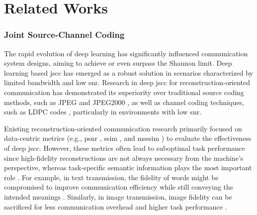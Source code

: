 \section{Related Works}
\subsubsection{Joint Source-Channel Coding}
The rapid evolution of deep learning has significantly influenced communication system designs, aiming to achieve or even surpass the Shannon limit. Deep learning based \gls{jscc} has emerged as a robust solution in scenarios characterized by limited bandwidth and low \gls{snr}. Research in deep \gls{jscc} for reconstruction-oriented communication \cite{Kurka_2019_SRo, Bourtsoulatze_2019_DJS, Kurka_2020_DfD} has demonstrated its superiority over traditional source coding methods, such as JPEG \cite{Wallace_1992_TJs} and JPEG2000 \cite{Taubman_2002_JIc}, as well as channel coding techniques, such as LDPC codes \cite{Gallager_1962_Ldp}, particularly in environments with low \gls{snr}.

Existing reconstruction-oriented communication research primarily focused on data-centric metrics (e.g., \gls{psnr} \cite{Kurka_2019_SRo, Tung_2022_DQC, Yang_2022_OGD, Tung_2022_DLA, Kurka_2020_DfD}, \gls{ssim} \cite{Bourtsoulatze_2019_DJS, Tung_2022_DLA, Yang_2022_OGD, Kurka_2020_DfD}, and \gls{msssim} \cite{Yang_2022_OGD, Tung_2022_DLA, Kurka_2020_DfD}) to evaluate the effectiveness of deep \gls{jscc}. However, these metrics often lead to suboptimal task performance since high-fidelity reconstructions are not always necessary from the machine's perspective, whereas task-specific semantic information plays the most important role \cite{Chaccour_2024_LDM, Yang_2023_SCf, Qin_2021_ScP, Strinati_2024_GOa, Pandey_2023_GOC, Kang_2023_PSi}. For example, in text transmission, the fidelity of words might be compromised to improve communication efficiency while still conveying the intended meanings \cite{Xie_2021_DLE, Farsad_2018_DLf}. Similarly, in image transmission, image fidelity can be sacrificed for less communication overhead and higher task performance \cite{Hu_2022_RSC, Diao_2024_TOS, Diao_2024_TTG}. 


